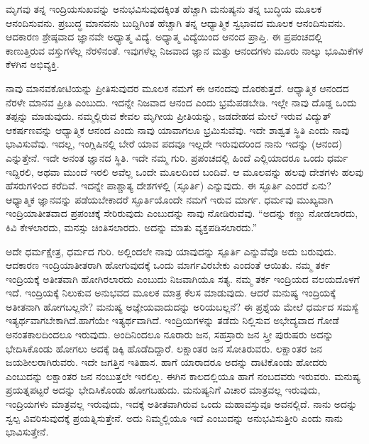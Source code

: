 \vskip 2pt

ಮೃಗವು ತನ್ನ ಇಂದ್ರಿಯಸುಖವನ್ನು ಅನುಭವಿಸುವುದಕ್ಕಿಂತ ಹೆಚ್ಚಾಗಿ ಮನುಷ್ಯನು ತನ್ನ ಬುದ್ಧಿಯ ಮೂಲಕ ಆನಂದಿಸುವನು. ಪ್ರಬುದ್ಧ ಮಾನವನು ಬುದ್ದಿಗಿಂತ ಹೆಚ್ಚಾಗಿ ತನ್ನ ಆಧ್ಯಾತ್ಮಿಕ ಸ್ವಭಾವದ ಮೂಲಕ ಆನಂದಿಸುವನು. ಆದಕಾರಣ ಶ್ರೇಷ್ಠವಾದ ಜ್ಞಾನವೇ ಅಧ್ಯಾತ್ಮ ವಿದ್ಯೆ. ಅಧ್ಯಾತ್ಮ ವಿದ್ಯೆಯಿಂದ ಆನಂದ ಪ್ರಾಪ್ತಿ. ಈ ಪ್ರಪಂಚದಲ್ಲಿ ಕಾಣುತ್ತಿರುವ ವಸ್ತುಗಳೆಲ್ಲ ನೆರಳಿನಂತೆ. ಇವುಗಳೆಲ್ಲ ನಿಜವಾದ ಜ್ಞಾನ ಮತ್ತು ಆನಂದಗಳು ಮೂರು ನಾಲ್ಕು ಭೂಮಿಕೆಗಳ ಕೆಳಗಿನ ಅಭಿವ್ಯಕ್ತಿ.

\vskip 2pt

ನಾವು ಮಾನವಕೋಟಿಯನ್ನು ಪ್ರೀತಿಸುವುದರ ಮೂಲಕ ನಮಗೆ ಈ ಆನಂದವು ದೊರಕುತ್ತದೆ. ಆಧ್ಯಾತ್ಮಿಕ ಆನಂದದ ನೆರಳೇ ಮಾನವ ಪ್ರೀತಿ ಎಂಬುದು. ಇದನ್ನೇ ನಿಜವಾದ ಆನಂದ ಎಂದು ಭ್ರಮೆಪಡಬೇಡಿ. ಇಲ್ಲೇ ನಾವು ದೊಡ್ಡ ಒಂದು ತಪ್ಪನ್ನು ಮಾಡುವುದು. ನಮ್ಮಲ್ಲಿರುವ ಕೇವಲ ಮೃಗೀಯ ಪ್ರೀತಿಯನ್ನು, ಜಡದೇಹದ ಮೇಲೆ ಇರುವ ವಿದ್ಯುತ್ ಆಕರ್ಷಣವನ್ನು ಆಧ್ಯಾತ್ಮಿಕ ಆನಂದ ಎಂದು ನಾವು ಯಾವಾಗಲೂ ಭ್ರಮಿಸುವೆವು. ಇದೇ ಶಾಶ್ವತ ಸ್ಥಿತಿ ಎಂದು ನಾವು ಭಾವಿಸುವೆವು. ಇದಲ್ಲ, ಇಂಗ್ಲಿಷಿನಲ್ಲಿ ಬೇರೆ ಯಾವ ಪದವೂ ಇಲ್ಲದೇ ಇರುವುದರಿಂದ ನಾನು ಇದನ್ನು  (ಆನಂದ) ಎನ್ನುತ್ತೇನೆ. ಇದೇ ಅನಂತ ಜ್ಞಾನದ ಸ್ಥಿತಿ. ಇದೇ ನಮ್ಮ ಗುರಿ. ಪ್ರಪಂಚದಲ್ಲಿ ಹಿಂದೆ ಎಲ್ಲಿಯಾದರೂ ಒಂದು ಧರ್ಮ ಇದ್ದಿರಲಿ, ಅಥವಾ ಮುಂದೆ ಇರಲಿ ಅವೆಲ್ಲ ಒಂದೇ ಮೂಲದಿಂದ ಬಂದಿವೆ. ಆ ಮೂಲವನ್ನು ಹಲವು ದೇಶಗಳು ಹಲವು ಹೆಸರುಗಳಿಂದ ಕರೆದಿವೆ. ಇದನ್ನೇ ಪಾಶ್ಚಾತ್ಯ ದೇಶಗಳಲ್ಲಿ  (ಸ್ಫೂರ್ತಿ) ಎನ್ನುವುದು. ಈ ಸ್ಫೂರ್ತಿ ಎಂದರೆ ಏನು? ಆಧ್ಯಾತ್ಮಿಕ ಜ್ಞಾನವನ್ನು ಪಡೆಯಬೇಕಾದರೆ ಸ್ಫೂರ್ತಿಯೊಂದೇ ನಮಗೆ ಇರುವ ಮಾರ್ಗ. ಧರ್ಮವು ಮುಖ್ಯವಾಗಿ ಇಂದ್ರಿಯಾತೀತವಾದ ಪ್ರಪಂಚಕ್ಕೆ ಸೇರಿರುವುದು ಎಂಬುದನ್ನು ನಾವು ನೋಡಿರುವೆವು. “ಅದನ್ನು ಕಣ್ಣು ನೋಡಲಾರದು, ಕಿವಿ ಕೇಳಲಾರದು, ಮನಸ್ಸು ಚಿಂತಿಸಲಾರದು. ಅದನ್ನು ಮಾತು ವ್ಯಕ್ತಪಡಿಸಲಾರದು.”

\vskip 2pt

ಅದೇ ಧರ್ಮಕ್ಷೇತ್ರ, ಧರ್ಮದ ಗುರಿ. ಅಲ್ಲಿಂದಲೇ ನಾವು ಯಾವುದನ್ನು ಸ್ಪೂರ್ತಿ ಎನ್ನುವೆವೊ ಅದು ಬರುವುದು. ಆದಕಾರಣ ಇಂದ್ರಿಯಾತೀತರಾಗಿ ಹೋಗುವುದಕ್ಕೆ ಒಂದು ಮಾರ್ಗವಿರಬೇಕು ಎಂದಂತೆ ಆಯಿತು. ನಮ್ಮ ತರ್ಕ ಇಂದ್ರಿಯಕ್ಕೆ ಅತೀತವಾಗಿ ಹೋಗಿರಲಾರದು ಎಂಬುದು ನಿಜವಾಗಿಯೂ ಸತ್ಯ. ನಮ್ಮ ತರ್ಕ ಇಂದ್ರಿಯದ ವಲಯದೊಳಗೆ ಇದೆ. ಇಂದ್ರಿಯಕ್ಕೆ ನಿಲುಕುವ ಅನುಭವದ ಮೂಲಕ ಮಾತ್ರ ಕೆಲಸ ಮಾಡುವುದು. ಆದರೆ ಮನುಷ್ಯ ಇಂದ್ರಿಯಕ್ಕೆ ಅತೀತನಾಗಿ ಹೋಗಬಲ್ಲನೇ? ಮನುಷ್ಯ ಅಜ್ಞೇಯವಾದುದನ್ನು ಅರಿಯಬಲ್ಲನೆ? ಈ ಪ್ರಶ್ನೆಯ ಮೇಲೆ ಧರ್ಮದ ಸಮಸ್ಯೆ ಇತ್ಯರ್ಥವಾಗಬೇಕಾಗಿದೆ.\break ಹಾಗೆಯೇ ಇತ್ಯರ್ಥವಾಗಿದೆ. ಇಂದ್ರಿಯಗಳನ್ನು ತಡೆದು ನಿಲ್ಲಿಸುವ ಅಭೇದ್ಯವಾದ ಗೋಡೆ ಅನಂತಕಾಲದಿಂದಲೂ ಇರುವುದು. ಅಂದಿನಿಂದಲೂ ನೂರಾರು ಜನ, ಸಹಸ್ರಾರು ಜನ ಸ್ತ್ರೀ ಪುರುಷರು ಅದನ್ನು ಭೇದಿಸಿಕೊಂಡು ಹೋಗಲು ಅದಕ್ಕೆ ಡಿಕ್ಕಿ ಹೊಡೆದಿದ್ದಾರೆ. ಲಕ್ಷಾಂತರ ಜನ ಸೋತಿರುವರು. ಲಕ್ಷಾಂತರ ಜನ ಜಯಶೀಲರಾಗಿರುವರು. ಇದೇ ಜಗತ್ತಿನ ಇತಿಹಾಸ. ಹಾಗೆ ಯಾರಾದರೂ ಅದನ್ನು ದಾಟಿಕೊಂಡು ಹೋದರು ಎಂಬುದನ್ನು ಲಕ್ಷಾಂತರ ಜನ ನಂಬುತ್ತಲೇ ಇರಲಿಲ್ಲ. ಈಗಿನ ಕಾಲದಲ್ಲಿಯೂ ಹಾಗೆ ನಂಬದವರು ಇರುವರು. ಮನುಷ್ಯ ಪ್ರಯತ್ನಪಟ್ಟರೆ ಅದನ್ನು ಭೇದಿಸಿಕೊಂಡು ಹೋಗಬಹುದು. ಮನುಷ್ಯನಿಗೆ ವಿಚಾರ ಮಾತ್ರವಲ್ಲ ಇರುವುದು, ಇಂದ್ರಿಯಗಳು ಮಾತ್ರವಲ್ಲ ಇರುವುದು, ಇದಕ್ಕೆ ಅತೀತವಾಗಿರುವ ಒಂದು ಮಹಾವಸ್ತುವೂ ಅವನಲ್ಲಿದೆ. ನಾನು ಅದನ್ನು ಸ್ವಲ್ಪ ವಿವರಿಸುವುದಕ್ಕೆ ಪ್ರಯತ್ನಿಸುತ್ತೇನೆ. ಅದು ನಿಮ್ಮಲ್ಲಿಯೂ ಇದೆ ಎಂಬುದನ್ನು ಅನುಭವಿಸುತ್ತೀರಿ ಎಂದು ನಾನು ಭಾವಿಸುತ್ತೇನೆ.

